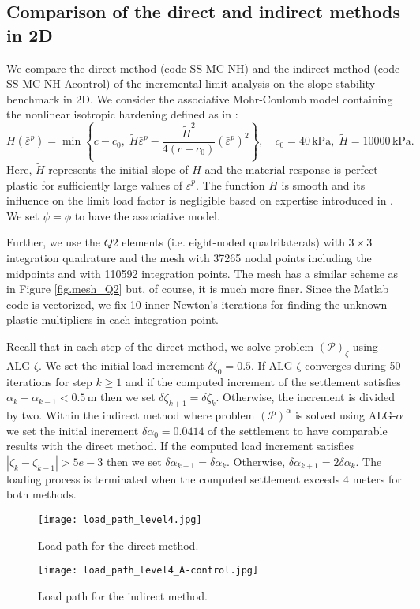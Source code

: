 \documentclass[a4paper,12pt]{article}
\theoremstyle{remark}
\numberwithin{equation}{section}
\begin{document}
\subsection{Comparison of the direct and indirect methods in 2D}
\label{subsec_comparison}

We compare the direct method (code SS-MC-NH) and the indirect method (code SS-MC-NH-Acontrol) of the incremental limit analysis on the slope stability benchmark in 2D. We consider the associative Mohr-Coulomb model containing the nonlinear isotropic hardening defined as in \cite{SCKKZB15}:
$$H(\bar\varepsilon^p)=\min\left\{c-c_0,\;\tilde H\bar\varepsilon^p-\frac{\tilde H^2}{4(c-c_0)}(\bar\varepsilon^p)^2\right\},\quad c_0=40\, \mbox{kPa}, \; \tilde H=10000\,\mbox{kPa}.$$
Here, $\tilde H$ represents the initial slope of $H$ and the material response is perfect plastic for sufficiently large values of $\bar\varepsilon^p$. The function $H$ is smooth and its influence on the limit load factor is negligible based on expertise introduced in \cite{SCKKZB15}. We set $\psi=\phi$ to have the associative model. 

Further, we use the $Q2$ elements (i.e. eight-noded quadrilaterals) with $3\times 3$ integration quadrature and the mesh with 37265 nodal points including the midpoints and with 110592 integration points. The mesh has a similar scheme as in  Figure \ref{fig.mesh_Q2} but, of course, it is much more finer. Since the Matlab code is vectorized, we fix 10 inner Newton's iterations for finding the unknown plastic multipliers in each integration point.

Recall that in each step of the direct method, we solve problem $(\mathcal P)_\zeta$ using ALG-$\zeta$. We set the initial load increment $\delta\zeta_0=0.5$.  If  ALG-$\zeta$ converges during 50 iterations for step $k\geq 1$ and if the computed increment of the settlement satisfies $\alpha_k-\alpha_{k-1}<0.5\,$m  then we set $\delta\zeta_{k+1}=\delta\zeta_k$. Otherwise, the increment is divided by two. Within the indirect method where  problem $(\mathcal P)^\alpha$ is solved using ALG-$\alpha$ we set the initial increment $\delta\alpha_0=0.0414$ of the settlement to have comparable results with the direct method. If the computed load increment satisfies $|\zeta_k-\zeta_{k-1}|>5e-3$ then we set $\delta\alpha_{k+1}=\delta\alpha_{k}$. Otherwise, $\delta\alpha_{k+1}=2\delta\alpha_{k}$. The loading process is terminated when the computed settlement exceeds 4 meters for both methods. 

\begin{figure}[htbp]
\begin{minipage}[t]{0.47\textwidth}
  \center
  \texttt{[image: load\_path\_level4.jpg]}
   \caption{\small{Load path for the direct method.}}
   \label{fig.load_path}
\end{minipage}
\hfill
\begin{minipage}[t]{0.47\textwidth}
  \center
   \texttt{[image: load\_path\_level4\_A-control.jpg]}
   \caption{\small{Load path for the indirect method.}}
   \label{fig.load_path_A-control}
\end{minipage}
\end{figure}
\end{document}

